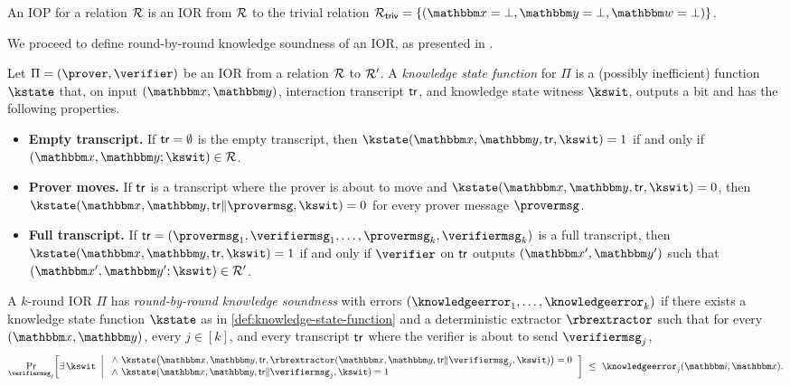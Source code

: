 \documentclass[11pt,letterpaper,usenames,dvipsnames]{article}
\begin{document}
\begin{remark}
    An IOP for a relation $\mathcal{R}$ is an IOR from $\mathcal{R}$ to the trivial relation $\Relation_{\mathsf{triv}}=\{(\inp=\bot,\oracle=\bot, \wit=\bot)\}$.
\end{remark}

We proceed to define round-by-round knowledge soundness of an IOR, as presented in \cite{TCC:BCFW25}.


\begin{definition}
\label{def:knowledge-state-function}
Let $\Pi = (\prover, \verifier)$ be an IOR from a relation $\mathcal{R}$ to $\mathcal{R}'$. A \emph{knowledge state function} for $\Pi$ is a (possibly inefficient) function $\kstate$ that, on input  $(\inp, \oracle)$, interaction transcript $\mathsf{tr}$, and knowledge state witness $\kswit$, outputs a bit and has the following properties.
\begin{itemize}[nosep]
  \item \textbf{Empty transcript.} If $\mathsf{tr} = \emptyset$ is the empty transcript, then $\kstate(\inp, \oracle, \tr, \kswit) = 1$ if and only if $(\inp, \oracle; \kswit) \in \Relation$.
  \item \textbf{Prover moves.} If $\mathsf{tr}$ is a transcript where the prover is about to move and $\kstate(\inp, \oracle, \tr, \kswit) = 0$, then $\kstate(\inp, \oracle, \tr \Vert \provermsg, \kswit) = 0$ for every prover message $\provermsg$.
  \item \textbf{Full transcript.} If $\tr = (\provermsg_1, \verifiermsg_1, \ldots, \provermsg_k, \verifiermsg_k)$ is a full transcript, then $\kstate(\inp, \oracle, \tr, \kswit) = 1$ if and only if $\verifier$ on $\mathsf{tr}$ outputs $(\inp', \oracle')$ such that $(\inp', \oracle'; \kswit) \in \Relation'$.
\end{itemize}
\end{definition}

\begin{definition}
\label{def:rbr-knowledge-new}
A $k$-round IOR $\Pi$ has \emph{round-by-round knowledge soundness} with errors $(\knowledgeerror_1,\ldots,\knowledgeerror_k)$ if there exists a knowledge state function $\kstate$ as in \cref{def:knowledge-state-function} and a deterministic extractor $\rbrextractor$ such that for every $(\inp,\oracle)$, every $j\in[k]$, and every transcript $\mathsf{tr}$ where the verifier is about to send $\verifiermsg_j$,
\[
  \Pr_{\verifiermsg_j}\!\left[
  \exists\,\kswit \ \left| \ \begin{array}{l}
  \wedge\ \kstate\bigl(\inp,\oracle,\tr,\rbrextractor(\inp,\oracle,\tr\Vert\verifiermsg_j,\kswit)\bigr)=0\\
  \wedge\ \kstate(\inp,\oracle,\tr\Vert\verifiermsg_j,\kswit)=1
  \end{array}
  \right.\right]
  \ \le\ \knowledgeerror_j(\idx,\inp).
\]
\end{definition}
\end{document}
